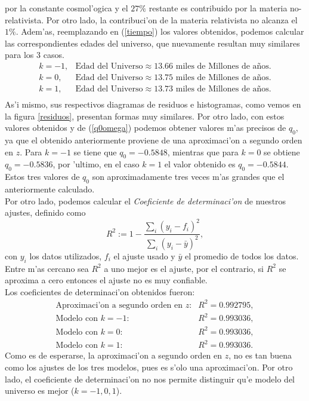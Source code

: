 por la constante cosmol'ogica y el $27\%$ restante es contribuido por la materia no-relativista. Por otro lado, la contribuci'on
de la materia relativista no alcanza el $1\%$. Adem'as, reemplazando en (\ref{tiempo}) los valores obtenidos, podemos
calcular las correspondientes edades del universo, que nuevamente resultan muy similares para los 3 casos.\\
\begin{equation}
\begin{array}{ll}
k=-1,& \mbox{Edad del Universo} \approx 13.66 \mbox{ miles de Millones de a\~nos}.\\
k=0, & \mbox{Edad del Universo} \approx 13.75 \mbox{ miles de Millones de a\~nos}.\\
k=1, & \mbox{Edad del Universo} \approx 13.73 \mbox{ miles de Millones de a\~nos}.\\
\end{array}
\end{equation}
As'i mismo, sus respectivos diagramas de residuos e histogramas, como vemos en la figura \ref{residuos}, presentan formas muy similares.
Por otro lado, con estos valores obtenidos y de (\ref{q0omega}) podemos obtener valores m'as precisos de $q_0$, ya que el obtenido anteriormente
proviene de una aproximaci'on a segundo orden en $z$. Para $k=-1$ se tiene que $q_0=-0.5848$, mientras que para $k=0$ se obtiene $q_0=-0.5836$, por 'ultimo,
 en el caso $k=1$ el valor obtenido es $ q_0=-0.5844$. Estos tres valores de $q_0$ son aproximadamente tres veces m'as grandes que el anteriormente
 calculado.\\
 
 Por otro lado, podemos calcular el \textit{Coeficiente de determinaci'on} de nuestros ajustes, definido como 
\begin{equation}
 R^2:=1- \frac{\sum_i(y_i-f_i)^2}{\sum_i(y_i- \bar{y})^2},
\end{equation}
con $y_i$ los datos utilizados, $f_i$ el ajuste usado y $\bar{y}$ el promedio de todos los datos. Entre m'as cercano sea $R^2$ a uno
mejor es el ajuste, por el contrario, si $R^2$ se aproxima a cero entonces el ajuste no es muy confiable.\\
Los coeficientes de determinaci'on obtenidos fueron:
\begin{equation}
\begin{array}{rl}
\mbox{Aproximaci'on a segundo orden en $z$:}& R^2 = 0.992795,\\
\mbox{Modelo con $k=-1$:}& R^2 = 0.993036,\\
\mbox{Modelo con $k=0$:} & R^2 = 0.993036, \\
\mbox{Modelo con $k=1$:} & R^2 = 0.993036.
\end{array}
\end{equation}
Como es de esperarse, la aproximaci'on a segundo orden en $z$, no es tan buena como los ajustes de los tres modelos, pues es s'olo una 
aproximaci'on. Por otro lado, el coeficiente de determinaci'on no nos permite distinguir qu'e modelo del universo es mejor ($k=-1,0,1$).\\
 
